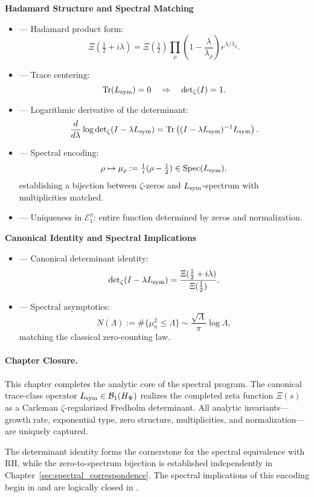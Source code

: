\textbf{Hadamard Structure and Spectral Matching}
\begin{itemize}
  \item {} — Hadamard product form:
  \[
  \Xi\left( \tfrac{1}{2} + i\lambda \right) = \Xi\left( \tfrac{1}{2} \right) \prod_{\rho} \left(1 - \frac{\lambda}{\lambda_\rho}\right) e^{\lambda/\lambda_\rho}.
  \]
  \item {} — Trace centering:
  \[
  \operatorname{Tr}(L_{\mathrm{sym}}) = 0 \quad \Rightarrow \quad \det\nolimits_{\zeta}(I) = 1.
  \]
  \item {} — Logarithmic derivative of the determinant:
  \[
  \frac{d}{d\lambda} \log \det\nolimits_{\zeta}(I - \lambda L_{\mathrm{sym}}) = \operatorname{Tr}\left( (I - \lambda L_{\mathrm{sym}})^{-1} L_{\mathrm{sym}} \right).
  \]
  \item {} — Spectral encoding:
  \[
  \rho \mapsto \mu_\rho := \tfrac{1}{i}(\rho - \tfrac{1}{2}) \in \operatorname{Spec}(L_{\mathrm{sym}}),
  \]
  establishing a bijection between \( \zeta \)-zeros and \( L_{\mathrm{sym}} \)-spectrum with multiplicities matched.
  \item {} — Uniqueness in \( \mathcal{E}_1^\pi \): entire function determined by zeros and normalization.
\end{itemize}

\textbf{Canonical Identity and Spectral Implications}
\begin{itemize}
  \item {} — Canonical determinant identity:
  \[
  \det\nolimits_{\zeta}(I - \lambda L_{\mathrm{sym}}) = \frac{\Xi(\tfrac{1}{2} + i\lambda)}{\Xi(\tfrac{1}{2})}.
  \]
  \item {} — Spectral asymptotics:
  \[
  N(\Lambda) := \#\{ \mu_n^2 \le \Lambda \} \sim \frac{\sqrt{\Lambda}}{\pi} \log \Lambda,
  \]
  matching the classical zero-counting law.
\end{itemize}

\paragraph{Chapter Closure.}
This chapter completes the analytic core of the spectral program. The canonical trace-class operator \( L_{\mathrm{sym}} \in \mathcal{B}_1(H_{\Psi}) \) realizes the completed zeta function \( \Xi(s) \) as a Carleman \(\zeta\)-regularized Fredholm determinant. All analytic invariants—growth rate, exponential type, zero structure, multiplicities, and normalization—are uniquely captured.

The determinant identity forms the cornerstone for the spectral equivalence with RH, while the zero-to-spectrum bijection is established independently in Chapter~\ref{sec:spectral_correspondence}. The spectral implications of this encoding begin in  and are logically closed in .
